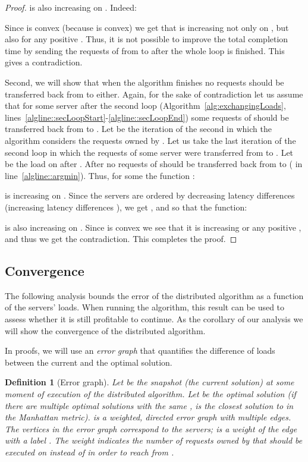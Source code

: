 \documentclass[11pt]{article}
\newtheorem{definition}{Definition}
\begin{document}
\begin{proof}
is also increasing on . Indeed:

Since  is convex (because  is convex) we get that  is increasing not only on , but also for any positive . Thus, it is not possible to improve the total completion time by sending the requests of  from  to  after the whole loop is finished. This gives a contradiction.

Second, we will show that when the algorithm finishes no requests should be transferred back from  to  either.
Again, for the sake of contradiction let us assume that for some server  after the second loop (Algorithm~\ref{alg:exchangingLoads}, lines~\ref{algline::secLoopStart}-\ref{algline::secLoopEnd}) some requests of  should be transferred back from  to .
Let  be the iteration of the second in which the algorithm considers the requests owned by .
Let us take the last iteration  of the second loop in which the requests of some server  were transferred from  to .
Let  be the load on  after . 
After  no requests of  should be transferred back from  to  ( in line~\ref{algline::argmin}). Thus, for some  the function :

is increasing on . Since the servers are ordered by decreasing latency differences   (increasing latency differences  ), we get , and so that the function: 

is also increasing on . Since  is convex we see that it is increasing or any positive , and thus we get the contradiction. This completes the proof.
\end{proof}


\subsection{Convergence}\label{sec:convergence}
The following analysis bounds the error of the distributed algorithm as a function of the servers' loads. When running the algorithm, this result can be used to assess whether it is still profitable to continue. As the corollary of our analysis we will show the convergence of the distributed algorithm. 

In proofs, we will use an \emph{error graph} that quantifies the difference of loads between the current and the optimal solution.

\begin{definition}[Error graph]
Let  be the snapshot (the current solution) at some moment of execution of the distributed algorithm. 
Let  be the optimal solution (if there are multiple optimal solutions with the same ,  is the closest solution to  in the Manhattan metric).
 is a weighted, directed \emph{error graph} with multiple edges. The vertices in the error graph correspond to the servers;  is a weight of the edge  with a label . The weight indicates the number of requests owned by  that should be executed on  instead of  in order to reach  from .
\end{definition}
\end{document}
